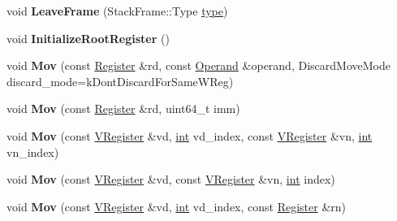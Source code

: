 \begin{DoxyCompactItemize}
\item 
\mbox{\label{classv8_1_1internal_1_1TurboAssembler_a6fcf697a920fa427114a1923f03da4d8}} 
void {\bfseries Leave\+Frame} (Stack\+Frame\+::\+Type \mbox{\hyperlink{classstd_1_1conditional_1_1type}{type}})
\item 
\mbox{\label{classv8_1_1internal_1_1TurboAssembler_a919c742613dc1bcf65b76c2c8dddde57}} 
void {\bfseries Initialize\+Root\+Register} ()
\item 
\mbox{\label{classv8_1_1internal_1_1TurboAssembler_a52471994b6329302311564786700223c}} 
void {\bfseries Mov} (const \mbox{\hyperlink{classv8_1_1internal_1_1Register}{Register}} \&rd, const \mbox{\hyperlink{classv8_1_1internal_1_1Operand}{Operand}} \&operand, Discard\+Move\+Mode discard\+\_\+mode=k\+Dont\+Discard\+For\+Same\+W\+Reg)
\item 
\mbox{\label{classv8_1_1internal_1_1TurboAssembler_ad7060dee15df13ccab0baf14872da8ed}} 
void {\bfseries Mov} (const \mbox{\hyperlink{classv8_1_1internal_1_1Register}{Register}} \&rd, uint64\+\_\+t imm)
\item 
\mbox{\label{classv8_1_1internal_1_1TurboAssembler_a510a608b2f37da998a64c2f97bb3d97a}} 
void {\bfseries Mov} (const \mbox{\hyperlink{classv8_1_1internal_1_1VRegister}{V\+Register}} \&vd, \mbox{\hyperlink{classint}{int}} vd\+\_\+index, const \mbox{\hyperlink{classv8_1_1internal_1_1VRegister}{V\+Register}} \&vn, \mbox{\hyperlink{classint}{int}} vn\+\_\+index)
\item 
\mbox{\label{classv8_1_1internal_1_1TurboAssembler_a2fbe24ff902733a15bcaad8994b2685d}} 
void {\bfseries Mov} (const \mbox{\hyperlink{classv8_1_1internal_1_1VRegister}{V\+Register}} \&vd, const \mbox{\hyperlink{classv8_1_1internal_1_1VRegister}{V\+Register}} \&vn, \mbox{\hyperlink{classint}{int}} index)
\item 
\mbox{\label{classv8_1_1internal_1_1TurboAssembler_a335b7e975925479758cef1a6386482fc}} 
void {\bfseries Mov} (const \mbox{\hyperlink{classv8_1_1internal_1_1VRegister}{V\+Register}} \&vd, \mbox{\hyperlink{classint}{int}} vd\+\_\+index, const \mbox{\hyperlink{classv8_1_1internal_1_1Register}{Register}} \&rn)

\end{DoxyCompactItemize}
